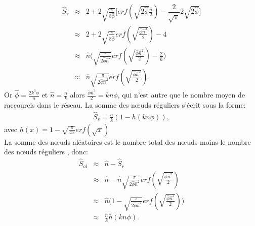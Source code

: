 \begin{eqnarray}\nonumber
\hat{S}_r&\approx&2+ 2\sqrt{\frac{\pi}{8\hat{\phi}}}\Big[erf(\sqrt{2\hat{\phi}}\frac{\hat{n}}{2})-\dfrac{2}{\sqrt{\pi}}2\sqrt{2\hat{\phi}}\Big] \\\nonumber
&\approx& 2+2\sqrt{\frac{\pi}{8\hat{\phi}}}erf(\sqrt{\frac{\hat{\phi}\hat{n}^2}{2}})-4  \\\nonumber
&\approx& \hat{n}\Big(\sqrt{\frac{\pi}{2\hat{\phi}\hat{n}^2}}erf(\sqrt{\frac{\hat{\phi}\hat{n}^2}{2}})-\frac{2}{\hat{n}}\Big)  \\
&\approx& \hat{n}\sqrt{\frac{\pi}{2\hat{\phi}\hat{n}^2}}erf(\sqrt{\frac{\hat{\phi}\hat{n}^2}{2}}).
\end{eqnarray}
Or $\hat{\phi}=\frac{2k^3\phi}{n}$ et $\hat{n}=\frac{n}{k}$ alors $\frac{\hat{\phi}\hat{n}^2}{2}=kn\phi$, qui n'est autre que le
nombre moyen de raccourcis dans le réseau. La somme des nœuds réguliers s'écrit sous la forme:
\begin{eqnarray}
\hat{S}_r=\frac{n}{k}(1-h(kn\phi)),
\end{eqnarray}
avec $h(x)=1-\sqrt{\frac{\pi}{4x}}erf(\sqrt{x})$\\
La somme des nœuds aléatoires est le nombre total des nœuds moins le nombre des nœuds réguliers , donc:
\begin{eqnarray}\nonumber
\hat{S}_{al}&\approx&\hat{n}-\hat{S}_r\\\nonumber
&\approx& \hat{n}-\hat{n}\sqrt{\frac{\pi}{2\hat{\phi}\hat{n}^2}}erf(\sqrt{\frac{\hat{\phi}\hat{n}^2}{2}})  \\\nonumber
&\approx& \hat{n}\Big(1-\sqrt{\frac{\pi}{2\hat{\phi}\hat{n}^2}}erf(\sqrt{\frac{\hat{\phi}\hat{n}^2}{2}})\Big)  \\
&\approx& \frac{n}{k}h(kn\phi).
\end{eqnarray}

